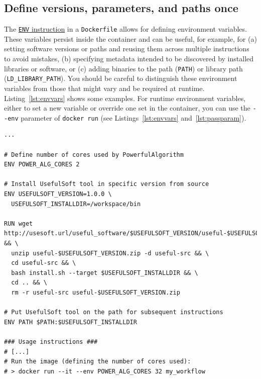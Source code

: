 \documentclass[10pt,letterpaper]{article}
\begin{document}
\hypertarget{define-versions-parameters-and-paths-once}{%
\subsection{Define versions, parameters, and paths
once}\label{define-versions-parameters-and-paths-once}}

The
\href{https://docs.docker.com/engine/reference/builder/\#env}{\texttt{ENV}
instruction} in a \texttt{Dockerfile} allows for defining environment
variables. These variables persist inside the container and can be
useful, for example, for (a) setting software versions or paths and
reusing them across multiple instructions to avoid mistakes, (b)
specifying metadata intended to be discovered by installed libraries or
software, or (c) adding binaries to the path (\texttt{PATH}) or library
path (\texttt{LD\_LIBRARY\_PATH}). You should be careful to distinguish
these environment variables from those that might vary and be required
at runtime. Listing~\ref{lst:envvars} shows some examples. For runtime
environment variables, either to set a new variable or override one set
in the container, you can use the \texttt{-\/-env} parameter of
\texttt{docker\ run} (see Listings~\ref{lst:envvars}
and~\ref{lst:passparam}).

\scriptsize

\begin{minipage}{\linewidth}

\begin{lstlisting}[language=docker,caption={Partial \texttt{Dockerfile} showing usage of environment variables with the `ENV` instruction.},breaklines=true,label={lst:envvars}]
...

# Define number of cores used by PowerfulAlgorithm
ENV POWER_ALG_CORES 2

# Install UsefulSoft tool in specific version from source
ENV USEFULSOFT_VERSION=1.0.0 \
  USEFULSOFT_INSTALLDIR=/workspace/bin

RUN wget http://usesoft.url/useful_software/$USEFULSOFT_VERSION/useful-$USEFULSOFT_VERSION.zip && \
  unzip useful-$USEFULSOFT_VERSION.zip -d useful-src && \
  cd useful-src && \
  bash install.sh --target $USEFULSOFT_INSTALLDIR && \
  cd .. && \
  rm -r useful-src useful-$USEFULSOFT_VERSION.zip

# Put UsefulSoft tool on the path for subsequent instructions
ENV PATH $PATH:$USEFULSOFT_INSTALLDIR

### Usage instructions ###
# [...]
# Run the image (defining the number of cores used):
# > docker run --it --env POWER_ALG_CORES 32 my_workflow
\end{lstlisting}

\end{minipage}
\end{document}
